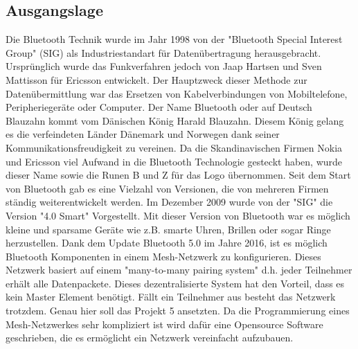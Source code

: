
\subsection{Ausgangslage}\label{subsec:Ausgangslage}

Die Bluetooth Technik wurde im Jahr 1998 von der "Bluetooth Special Interest Group" (SIG) als Industriestandart für Datenübertragung herausgebracht. Ursprünglich wurde das Funkverfahren jedoch von Jaap Hartsen und Sven Mattisson für Ericsson entwickelt. Der Hauptzweck dieser Methode zur Datenübermittlung war das Ersetzen von Kabelverbindungen von Mobiltelefone, Peripheriegeräte oder Computer. Der Name Bluetooth oder auf Deutsch Blauzahn kommt vom Dänischen König Harald Blauzahn. Diesem König gelang es die verfeindeten Länder Dänemark und Norwegen dank seiner Kommunikationsfreudigkeit zu vereinen. Da die Skandinavischen Firmen Nokia und Ericsson viel Aufwand in die Bluetooth Technologie gesteckt haben, wurde dieser Name sowie die Runen B und Z für das Logo übernommen. Seit dem Start von Bluetooth gab es eine Vielzahl von Versionen, die von mehreren Firmen ständig weiterentwickelt werden. Im Dezember 2009 wurde von der "SIG" die Version "4.0 Smart" Vorgestellt. Mit dieser Version von Bluetooth war es möglich kleine und sparsame Geräte wie z.B. smarte Uhren, Brillen oder sogar Ringe herzustellen. Dank dem Update Bluetooth 5.0 im Jahre 2016, ist es möglich Bluetooth Komponenten in einem Mesh-Netzwerk zu konfigurieren. Dieses Netzwerk basiert auf einem "many-to-many pairing system" d.h. jeder Teilnehmer erhält alle Datenpackete. Dieses dezentralisierte System hat den Vorteil, dass es kein Master Element benötigt. Fällt ein Teilnehmer aus besteht das Netzwerk trotzdem. Genau hier soll das Projekt 5 ansetzten. Da die Programmierung eines Mesh-Netzwerkes sehr kompliziert ist wird dafür eine Opensource Software geschrieben, die es ermöglicht ein Netzwerk vereinfacht aufzubauen. 








